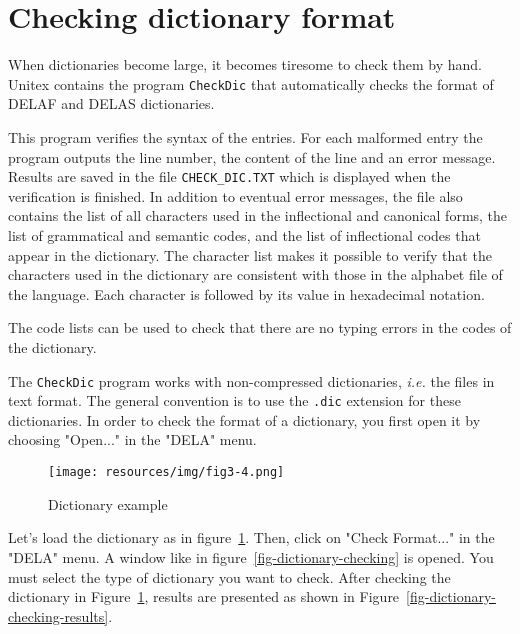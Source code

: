 \bigskip
\noindent

\section{Checking dictionary format}
 
When dictionaries become large, it becomes tiresome to check them by hand.
Unitex contains the program \verb+CheckDic+ that automatically checks the
format of DELAF and DELAS dictionaries.

\bigskip
\noindent This program verifies the syntax of the entries. For each malformed
entry the program outputs the line number, the content of the line and an error
message. Results are saved in the file
\verb+CHECK_DIC.TXT+ which is displayed when the
verification is finished. In addition to eventual error messages, the file also
contains the list of all characters used in the inflectional and canonical forms,
the list of grammatical and semantic codes, and the list of inflectional codes
that appear in the dictionary. The character list makes it possible to verify
that the characters used in the dictionary are consistent with those in the 
alphabet file of the language. Each character is followed by its value in hexadecimal
notation.

\bigskip
\noindent The code lists can be used to check that there are no typing errors 
in the codes of the dictionary.

\bigskip
\noindent The \verb+CheckDic+ program works with non-compressed dictionaries,
\textit{i.e.} the files in text format. The general convention is to use the
\verb+.dic+ extension for these dictionaries. In order to check the 
 format of a
dictionary, you first open it by choosing "Open..." in the "DELA" menu.

\begin{figure}[!ht]
\begin{center}
\texttt{[image: resources/img/fig3-4.png]}
\caption{Dictionary example\label{fig-dictionary-example}}
\end{center}
\end{figure}

\noindent Let's load the dictionary as in figure~\ref{fig-dictionary-example}.
Then, click on "Check Format..." in the
"DELA" menu. A window like in
figure~\ref{fig-dictionary-checking} is opened. You
must select the type of dictionary you want to check. After checking the dictionary in Figure~\ref{fig-dictionary-example}, 
results are presented as shown in Figure~\ref{fig-dictionary-checking-results}.

